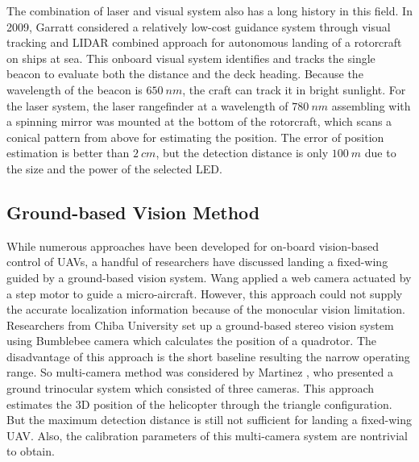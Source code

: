 
The combination of laser and visual system also has a long history in this field. In 2009, Garratt \cite{garrattvisual2009} considered a relatively low-cost guidance system through visual tracking and LIDAR combined approach for autonomous landing of a rotorcraft on ships at sea. This onboard visual system identifies and tracks the single beacon to evaluate both the distance and the deck heading. Because the wavelength of the beacon is $650\ nm$, the craft can track it in bright sunlight. For the laser system, the laser rangefinder at a wavelength of $780\ nm$ assembling with a spinning mirror was mounted at the bottom of the rotorcraft, which scans a conical pattern from above for estimating the position. The error of position estimation is better than $2\ cm$, but the detection distance is only $100\ m$ due to the size and the power of the selected LED. 

\subsection{Ground-based Vision Method}
While numerous approaches have been developed for on-board vision-based control of UAVs, a handful of researchers have discussed landing a fixed-wing guided by a ground-based vision system. Wang \cite{Wang2006} applied a web camera actuated by a step motor to guide a micro-aircraft. However, this approach could not supply the accurate localization information because of the monocular vision limitation. Researchers from Chiba University\cite{pebrianti2010autonomous} set up a ground-based stereo vision system using Bumblebee camera which calculates the position of a quadrotor. The disadvantage of this approach is the short baseline resulting the narrow operating range. So multi-camera method was considered by Martinez \cite{Martínez2013}, who presented a ground trinocular system which consisted of three cameras. This approach estimates the 3D position of the helicopter through the triangle configuration. But the maximum detection distance is still not sufficient for landing a fixed-wing UAV. Also, the calibration parameters of this multi-camera system are nontrivial to obtain.

